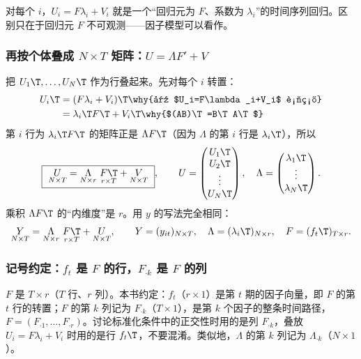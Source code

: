 对每个 $i$，$U_i=F\lambda_i+V_i$ 就是一个“回归元为 $F$、系数为 $\lambda_i$”的时间序列回归。区别只在于回归元 $F$ 不可观测——因子模型可以看作。

\subsubsection{再按个体叠成 \texorpdfstring{$N\times T$}{N x T} 矩阵：\texorpdfstring{$U=\Lambda F'+V$}{U = Lambda F' + V}}

把 $U_1\T,\dots,U_N\T$ 作为行叠起来。先对每个 $i$ 转置：
\begin{align*}
U_i\T&=(F\lambda_i+V_i)\T \why{对 $U_i=F\lambda_i+V_i$ 转置}\\
&=\lambda_i\T F\T+V_i\T \why{$(AB)\T=B\T A\T$}
\end{align*}
第 $i$ 行为 $\lambda_i\T F\T$ 的矩阵正是 $\Lambda F\T$（因为 $\Lambda$ 的第 $i$ 行是 $\lambda_i\T$），所以
\begin{equation}\label{eq:U13a-matrix}
\boxed{\ \underset{N\times T}{U}=\underset{N\times r}{\Lambda}\ \underset{r\times T}{F\T}+\underset{N\times T}{V}\ },\qquad
U=\begin{pmatrix}U_1\T\\U_2\T\\ \vdots\\U_N\T\end{pmatrix},\quad
\Lambda=\begin{pmatrix}\lambda_1\T\\ \vdots\\ \lambda_N\T\end{pmatrix}.
\end{equation}
乘积 $\Lambda F\T$ 的“内维度”是 $r$。用 $y$ 的写法完全相同：
\[
\underset{N\times T}{Y}=\underset{N\times r}{\Lambda}\ \underset{r\times T}{F\T}+\underset{N\times T}{U},\qquad
Y=(y_{it})_{N\times T},\quad \Lambda=(\lambda_i\T)_{N\times r},\quad F=(f_t\T)_{T\times r}.
\]

\subsubsection{记号约定：\texorpdfstring{$f_t$}{f\_t} 是 \texorpdfstring{$F$}{F} 的行，\texorpdfstring{$F_{\cdot k}$}{F\_.k} 是 \texorpdfstring{$F$}{F} 的列}

$F$ 是 $T\times r$（$T$ 行、$r$ 列）。本书约定：$f_t$（$r\times1$）是第 $t$ 期的因子向量，即 $F$ 的第 $t$ 行的转置；$F$ 的第 $k$ 列记为 $F_{\cdot k}$（$T\times1$），是第 $k$ 个因子的整条时间路径，$F=(F_{\cdot1},\dots,F_{\cdot r})$。讨论标准化条件中的正交性时用的是列 $F_{\cdot k}$，叠放 $U_i=F\lambda_i+V_i$ 时用的是行 $f_t\T$，不要混淆。类似地，$\Lambda$ 的第 $k$ 列记为 $\Lambda_{\cdot k}$（$N\times1$）。

